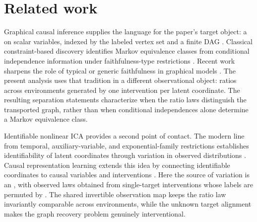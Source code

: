 \section{Related work}\label{sec:related-work}

Graphical causal inference supplies the language for the paper's target object: a  on  scalar variables, indexed by the labeled vertex set  and a finite DAG . Classical constraint-based discovery identifies Markov equivalence classes from conditional independence information under faithfulness-type restrictions \citep{Meek1995}. Recent work sharpens the role of typical or generic faithfulness in graphical models \citep{BoekenForreMooij2024TypicalFaithfulness}. The present analysis uses that tradition in a different observational object: ratios across environments generated by one intervention per latent coordinate. The resulting separation statements characterize when the ratio laws distinguish the transported graph, rather than when conditional independences alone determine a Markov equivalence class.

Identifiable nonlinear ICA provides a second point of contact. The modern line from temporal, auxiliary-variable, and exponential-family restrictions establishes identifiability of latent coordinates through variation in observed distributions \citep{Hyvarinen2001,Hyvarinen2016,Hyvarinen2019,Khemakhem2020,Hyvarinen2023}. Causal representation learning extends this idea by connecting identifiable coordinates to causal variables and interventions \citep{Brehmer2022,Lippe2022,Squires2022,Zhang2023}. Here the source of variation is an  , with observed laws  obtained from single-target interventions whose labels are permuted by . The shared invertible observation map keeps the ratio law invariantly comparable across environments, while the unknown target alignment makes the graph recovery problem genuinely interventional.

